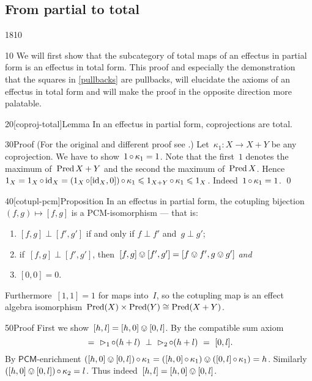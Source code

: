 \subsection{From partial to total}
\begin{parsec}{1810}%
\begin{point}{10}%
We will first show that the subcategory of
    total maps of an effectus in partial form
    is an effectus in total form.
This proof and especially the demonstration
    that the squares in \eqref{pullbacks} are pullbacks,
    will elucidate the axioms of an effectus in total form
    and will make the proof in the opposite direction more palatable.
\end{point}
\begin{point}{20}[coproj-total]{Lemma}%
In an effectus in partial form,
    coprojections are total.
\begin{point}{30}{Proof}%
    (For the original and different proof see \cite[lem.~4.7(5)]{kentapartial}.)
Let~$\kappa_1 \colon X \to X+Y$ be any coprojection.
We have to show~$1 \mathop{\circ} \kappa_1 = 1$.
Note that the first~$1$ denotes the maximum of~$\operatorname{Pred} X+Y$
    and the second the maximum of~$\operatorname{Pred} X$.
    Hence~$1_X = 1_X \mathop{\circ} \mathrm{id}_X = (1_X \mathop{\circ} [\mathrm{id}_X, 0]) \mathop{\circ} \kappa_1
                    \leqslant 1_{X+Y} \mathop{\circ} \kappa_1 \leqslant 1_X$.
Indeed~$1 \mathop{\circ} \kappa_1 = 1$. \qed
\end{point}
\end{point}
\begin{point}{40}[cotupl-pcm]{Proposition}%
In an effectus in partial form,
the cotupling bijection~$(f,g) \mapsto [f,g]$
    is a PCM-isomorphism \cite{effintro }---
    that is:
\begin{enumerate}
\item
    $[f,g] \perp [f',g']$ if and only if
        $f \perp f'$ and~$g \perp g'$;
\item
    if~$[f,g] \perp [f', g']$,
    then~$[f,g] \ovee [f',g'] = [f \ovee f', g\ovee g']$ \emph{and}
\item
    $[0,0] = 0$.
\end{enumerate}
Furthermore~$[1,1]=1$ for maps into~$I$,
so the cotupling map is an effect algebra
isomorphism~$\operatorname{Pred} (X) \times \operatorname{Pred} (Y) \cong \operatorname{Pred} (X+Y) $.
\begin{point}{50}{Proof}%
First we show~$[h,l] = [h,0] \ovee [0,l]$.
By the compatible sum axiom
\begin{equation*}
    [h, 0] \ = \ 
    \pproj_1 \after (h + l)
    \ \perp\  \pproj_2 \after (h + l)
    \ = \ [0, l].
\end{equation*}
By $\mathsf{PCM}$-enrichment
$([h, 0] \ovee [0, l]) \mathop{\circ} \kappa_1
         =  ([h, 0] \mathop{\circ} \kappa_1) \ovee
        ([0, l] \mathop{\circ} \kappa_1)  = h$.
Similarly~$([h, 0] \ovee [0, l]) \mathop{\circ} \kappa_2 = l$.
Thus indeed~$[h,l] = [h,0] \ovee [0,l]$.


\end{point}
\end{point}
\end{parsec}

